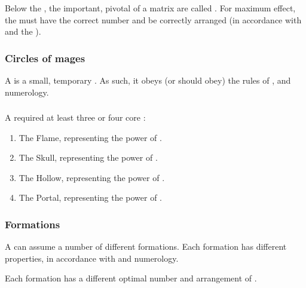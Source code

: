 \index{\cardinalpoint}
Below the \apex, the important, pivotal \vertices{} of a matrix are called \cardinalpoints. 
For maximum effect, the \cardinalpoints must have the correct number and be correctly arranged (in accordance with  and the ). 





\subsubsection{Circles of mages}
A  is {a small, temporary \matrix}. 
As such, it obeys (or should obey) the rules of ,  and numerology. 





\subsubsection{\Draconic \matrices}
A \draconic \matrix required at least three or four core \vertices: 
\begin{enumerate}
  \item The Flame, representing the power of \RuinSatha. 
  \item The Skull, representing the power of \KhothSell. 
  \item The Hollow, representing the power of \NaathKurRamalech. 
  \item The Portal, representing the power of \Achamoth. 
\end{enumerate}






\subsubsection{Formations}
A \matrix can assume a number of different formations. 
Each formation has different properties, in accordance with  and numerology. 

Each formation has a different optimal number and arrangement of . 





